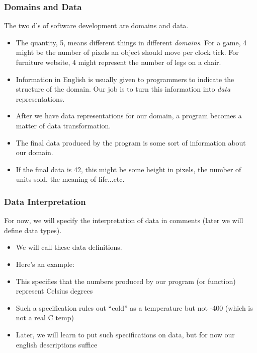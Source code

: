 \documentclass{beamer}
\begin{document}
\begin{frame}
  \frametitle{Domains and Data}
  The two d's of software development are domains and data.
  \begin{itemize}
  \item<2-> The quantity, 5, means different things in different \emph{domains}. For a game, 4 might be the number of pixels an object should move per clock tick. For furniture website, 4 might represent the number of legs on a chair.
  \item<3-> Information in English is usually given to programmers to indicate the structure of the domain. Our job is to turn this information into \emph{data}
    representations. 
  \item<4-> After we have data representations for our domain, a program becomes a matter of data transformation.
  \item<5-> The final data produced by the program is some sort of information about our domain.
  \item<6-> If the final data is 42, this might be some height in pixels, the number of units sold, the meaning of life...etc.
  \end{itemize}
\end{frame}


\begin{frame}
  \frametitle{Data Interpretation}
  For now, we will specify the interpretation of data in comments (later we will define data types).
  \begin{itemize}
  \item<2-> We will call these data definitions. 
  \item<3-> Here's an example: \dataDef
  \item<4-> This specifies that the numbers produced by our program (or function) represent Celsius degrees
  \item<5-> Such a specification rules out ``cold'' as a temperature but not -400 (which is not a real C temp)
  \item<6-> Later, we will learn to put such specifications on data, but for now our english descriptions suffice
  \end{itemize}
\end{frame}
\end{document}
